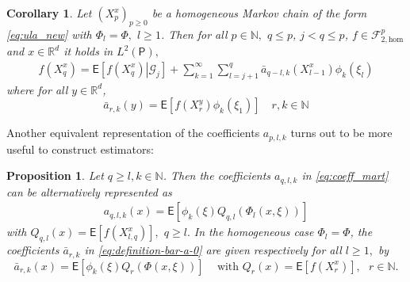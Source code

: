\documentclass[bj]{imsart}
\def\nset{\mathbb{N}}
\def\rset{\mathbb{R}}
\def\rset{\mathbb{R}}
\newtheorem{prop}[thm]{Proposition}
\newtheorem{cor}[thm]{Corollary}
\begin{document}
\begin{cor}
Let \((X^x_{p})_{p\geq 0}\) be a homogeneous Markov chain of the form \eqref{eq:ula_new} with $\Phi_l = \Phi,$ $l\geq 1$. Then for all $p \in \nset,$ $q \leq p$, $j < q \leq p$, $f \in \mathcal{F}_{2,\text{hom}}^p$ and $x \in \rset^d$ it holds in \(L^2(\mathsf{P}),\)
\begin{eqnarray*}
f(X^x_{q})=\mathsf{E}\left[\left.f(X^x_{q})\right|\mathcal G_{j}\right]+\sum_{k=1}^{\infty}\sum_{l=j+1}^{q}\bar a_{q-l,k}(X^x_{l-1})\phi_k\left(\xi_{l}\right)
\end{eqnarray*}
where for all $y \in \rset^d$,
\begin{equation}
\label{eq:definition-bar-a-0}
\bar a_{r,k}(y)=\mathsf{E}\left[f(X^y_{r})\phi_k\left(\xi_{1}\right)\right] \quad  r, k\in \mathbb{N}
\end{equation}
\end{cor}
Another equivalent representation of the coefficients \(a_{p,l,k}\)  turns out to be more useful to construct estimators:
\begin{prop}
Let $q\geq l, k\in \nset$. Then the coefficients \(a_{q,l,k}\) in \eqref{eq:coeff_mart}  can be alternatively represented as
\begin{eqnarray*}
a_{q,l,k}(x)=\mathsf{E}\left[\phi_k\left(\xi\right)Q_{q,l}\left(\Phi_l(x,\xi)\right)\right]
\end{eqnarray*}
with \(Q_{q,l}(x)=\mathsf{E}\left[f(X^x_{l,q})\right],\) \(q\geq l.\)
In the homogeneous case $\Phi_l=\Phi$, the coefficients $\bar{a}_{r,k}$ in \eqref{eq:definition-bar-a-0} are given respectively  for all $l\geq 1,$ by
\begin{equation}
\label{eq:definition-bar-a}
\bar a_{r,k}(x)=\mathsf{E}\left[\phi_k\left(\xi\right)Q_{r}\left(\Phi(x,\xi)\right)\right] \,
\quad \text{with  \(Q_{r}(x)=\mathsf{E}\left[f(X^x_{r})\right],\) $r\in \mathbb{N}.$}
\end{equation}
\end{prop}
\end{document}
